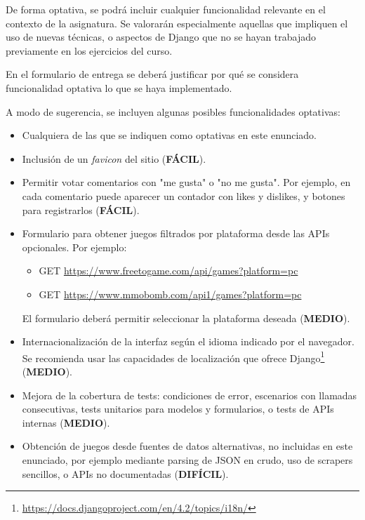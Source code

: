 De forma optativa, se podrá incluir cualquier funcionalidad relevante en el contexto de la asignatura. Se valorarán especialmente aquellas que impliquen el uso de nuevas técnicas, o aspectos de Django que no se hayan trabajado previamente en los ejercicios del curso.

En el formulario de entrega se deberá justificar por qué se considera funcionalidad optativa lo que se haya implementado.

A modo de sugerencia, se incluyen algunas posibles funcionalidades optativas:

\begin{itemize}
\item Cualquiera de las que se indiquen como optativas en este enunciado.

\item Inclusión de un \emph{favicon} del sitio (\textbf{FÁCIL}).

\item Permitir votar comentarios con "me gusta" o "no me gusta". Por ejemplo, en cada comentario puede aparecer un contador con likes y dislikes, y botones para registrarlos (\textbf{FÁCIL}).

\item Formulario para obtener juegos filtrados por plataforma desde las APIs opcionales. Por ejemplo:
\begin{itemize}
\item GET \url{https://www.freetogame.com/api/games?platform=pc}
\item GET \url{https://www.mmobomb.com/api1/games?platform=pc}
\end{itemize}
El formulario deberá permitir seleccionar la plataforma deseada (\textbf{MEDIO}).

\item Internacionalización de la interfaz según el idioma indicado por el navegador. Se recomienda usar las capacidades de localización que ofrece Django\footnote{\url{https://docs.djangoproject.com/en/4.2/topics/i18n/}} (\textbf{MEDIO}).

\item Mejora de la cobertura de tests: condiciones de error, escenarios con llamadas consecutivas, tests unitarios para modelos y formularios, o tests de APIs internas (\textbf{MEDIO}).

\item Obtención de juegos desde fuentes de datos alternativas, no incluidas en este enunciado, por ejemplo mediante parsing de JSON en crudo, uso de scrapers sencillos, o APIs no documentadas (\textbf{DIFÍCIL}).
\end{itemize}


